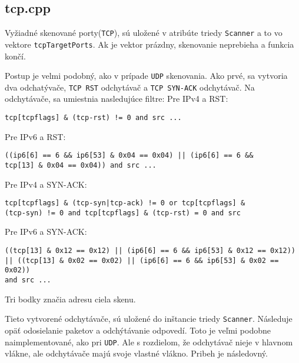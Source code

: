 \documentclass[titlepage]{article}
\begin{document}
\subsection{tcp.cpp}
Vyžiadné skenované porty(\verb|TCP|), sú uložené v atribúte triedy \verb|Scanner| a to vo vektore \verb|tcpTargetPorts|. Ak je vektor prázdny, skenovanie neprebieha a funkcia končí.\par 

Postup je velmi podobný, ako v prípade \verb|UDP| skenovania. Ako prvé, sa vytvoria dva odchatývače, \verb|TCP RST| odchytávač a \verb|TCP SYN-ACK| odchytávač. Na odchytávače, sa umiestnia nasledujúce filtre: \newline
Pre IPv4 a RST:
\begin{verbatim}
tcp[tcpflags] & (tcp-rst) != 0 and src ...
\end{verbatim}
Pre IPv6 a RST:
\begin{verbatim}
((ip6[6] == 6 && ip6[53] & 0x04 == 0x04) || (ip6[6] == 6 && 
tcp[13] & 0x04 == 0x04)) and src ...
\end{verbatim}
Pre IPv4 a SYN-ACK:
\begin{verbatim}
tcp[tcpflags] & (tcp-syn|tcp-ack) != 0 or tcp[tcpflags] & 
(tcp-syn) != 0 and tcp[tcpflags] & (tcp-rst) = 0 and src 
\end{verbatim}
Pre IPv6 a SYN-ACK:
\begin{verbatim}
((tcp[13] & 0x12 == 0x12) || (ip6[6] == 6 && ip6[53] & 0x12 == 0x12)) 
|| ((tcp[13] & 0x02 == 0x02) || (ip6[6] == 6 && ip6[53] & 0x02 == 0x02)) 
and src ...
\end{verbatim}

Tri bodky značia adresu ciela skenu. \par 

Tieto vytvorené odchytávače, sú uložené do inštancie triedy \verb|Scanner|. Následuje opäť odosielanie paketov a odchýtávanie odpovedí. Toto je veľmi podobne naimplementované, ako pri \verb|UDP|. Ale s rozdielom, že odchytávač nieje v hlavnom vlákne, ale odchytávače majú svoje vlastné vlákno. Pribeh je následovný.\par
\end{document}
